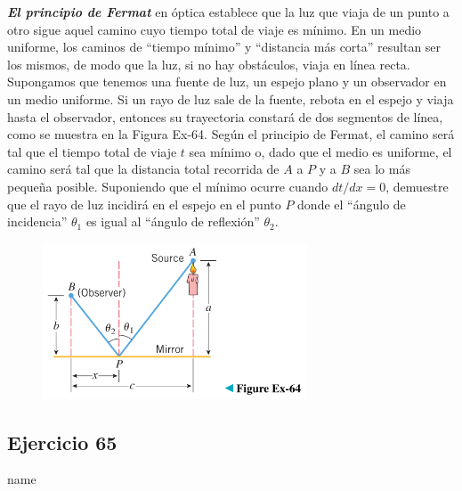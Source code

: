\documentclass[12pt]{article}
\begin{document}
\textit{\textbf{El principio de Fermat}} en óptica establece que la luz que viaja de un punto a otro sigue aquel camino cuyo tiempo total de viaje es mínimo. En un medio uniforme, los caminos de ``tiempo mínimo'' y ``distancia más corta'' resultan ser los mismos, de modo que la luz, si no hay obstáculos, viaja en línea recta. Supongamos que tenemos una fuente de luz, un espejo plano y un observador en un medio uniforme. Si un rayo de luz sale de la fuente, rebota en el espejo y viaja hasta el observador, entonces su trayectoria constará de dos segmentos de línea, como se muestra en la Figura Ex-64. Según el principio de Fermat, el camino será tal que el tiempo total de viaje $t$ sea mínimo o, dado que el medio es uniforme, el camino será tal que la distancia total recorrida de $A$ a $P$ y a $B$ sea lo más pequeña posible. Suponiendo que el mínimo ocurre cuando $dt/dx = 0$, demuestre que el rayo de luz incidirá en el espejo en el punto $P$ donde el ``ángulo de incidencia'' $\theta_1$ es igual al ``ángulo de reflexión'' $\theta_2$.
\begin{figure}[H]
\centering
\includegraphics[width=0.7\textwidth]{../img/img_Lista3/3_64.png}
\end{figure}

\subsection{Ejercicio 65} name \\
\end{document}

